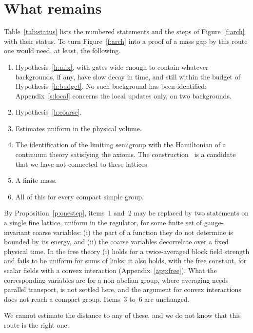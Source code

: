 \section{What remains}\label{s:rem}
Table~\ref{tab:status} lists the numbered statements and the steps of Figure~\ref{f:arch} with their status. To turn
Figure~\ref{f:arch} into a proof of a mass gap by this route one would need, at least, the following.
\begin{enumerate}
\item Hypothesis~\ref{h:mix}, with gates wide enough to contain whatever backgrounds, if any, have slow decay
in time, and still within the budget of Hypothesis~\ref{h:budget}. No such background has been identified:
Appendix~\ref{s:local} concerns the local updates only, on two backgrounds.
\item Hypothesis~\ref{h:coarse}.
\item Estimates uniform in the physical volume.
\item The identification of the limiting semigroup with the Hamiltonian of a continuum theory satisfying the
axioms. The construction~\cite{OAI} is a candidate that we have not connected to these lattices.
\item A finite mass.
\item All of this for every compact simple group.
\end{enumerate}
By Proposition~\ref{p:onestep}, items~1 and~2 may be replaced by two statements on a single fine lattice,
uniform in the regulator, for some finite set of gauge-invariant coarse variables: (i) the part of a
function they do not determine is bounded by its energy, and (ii) the coarse variables decorrelate over a
fixed physical time. In the free theory (i) holds for a twice-averaged block field strength and fails to be
uniform for sums of links; it also holds, with the free constant, for scalar fields with a convex
interaction (Appendix~\ref{app:free}). What the corresponding variables are for a non-abelian group, where
averaging needs parallel transport, is not settled here, and the argument for convex interactions does not
reach a compact group. Items~3 to~6 are unchanged.

We cannot estimate the distance to any of these, and we do not know that this route is the right one.

